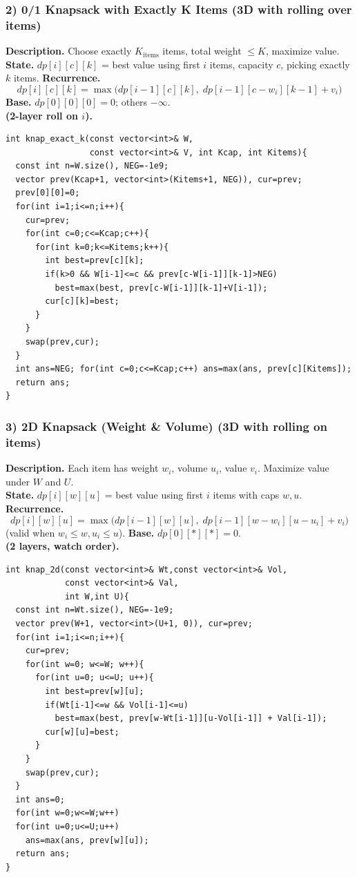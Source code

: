 \documentclass[9pt]{extarticle}
\begin{document}
\subsubsection{2) 0/1 Knapsack with Exactly K Items (3D with rolling over items)}
\textbf{Description.} Choose exactly \(K_{\text{items}}\) items, total weight \(\le K\), maximize value.  \\
\textbf{State.} \(dp[i][c][k]\) = best value using first \(i\) items, capacity \(c\), picking exactly \(k\) items.  
\textbf{Recurrence.}
\[
dp[i][c][k]=\max\Big(dp[i-1][c][k],\; dp[i-1][c-w_i][k-1]+v_i\Big)
\]
\textbf{Base.} \(dp[0][0][0]=0\); others \(-\infty\).  \\
\textbf{(2-layer roll on \(i\)).}
\begin{verbatim}
int knap_exact_k(const vector<int>& W, 
                 const vector<int>& V, int Kcap, int Kitems){
  const int n=W.size(), NEG=-1e9;
  vector prev(Kcap+1, vector<int>(Kitems+1, NEG)), cur=prev;
  prev[0][0]=0;
  for(int i=1;i<=n;i++){
    cur=prev;
    for(int c=0;c<=Kcap;c++){
      for(int k=0;k<=Kitems;k++){
        int best=prev[c][k];
        if(k>0 && W[i-1]<=c && prev[c-W[i-1]][k-1]>NEG)
          best=max(best, prev[c-W[i-1]][k-1]+V[i-1]);
        cur[c][k]=best;
      }
    }
    swap(prev,cur);
  }
  int ans=NEG; for(int c=0;c<=Kcap;c++) ans=max(ans, prev[c][Kitems]);
  return ans;
}
\end{verbatim}

\subsubsection{3) 2D Knapsack (Weight \& Volume) (3D with rolling on items)}
\textbf{Description.} Each item has weight \(w_i\), volume \(u_i\), value \(v_i\). Maximize value under \(W\) and \(U\).  \\
\textbf{State.} \(dp[i][w][u]\) = best value using first \(i\) items with caps \(w,u\).  \\
\textbf{Recurrence.}
\[
dp[i][w][u]=\max\Big(dp[i-1][w][u],\; dp[i-1][w-w_i][u-u_i]+v_i\Big)
\]
(valid when \(w_i\le w, u_i\le u\)).  
\textbf{Base.} \(dp[0][*][*]=0\).  \\
\textbf{(2 layers, watch order).}
\begin{verbatim}
int knap_2d(const vector<int>& Wt,const vector<int>& Vol,
            const vector<int>& Val,
            int W,int U){
  const int n=Wt.size(), NEG=-1e9;
  vector prev(W+1, vector<int>(U+1, 0)), cur=prev;
  for(int i=1;i<=n;i++){
    cur=prev;
    for(int w=0; w<=W; w++){
      for(int u=0; u<=U; u++){
        int best=prev[w][u];
        if(Wt[i-1]<=w && Vol[i-1]<=u)
          best=max(best, prev[w-Wt[i-1]][u-Vol[i-1]] + Val[i-1]);
        cur[w][u]=best;
      }
    }
    swap(prev,cur);
  }
  int ans=0; 
  for(int w=0;w<=W;w++) 
  for(int u=0;u<=U;u++) 
    ans=max(ans, prev[w][u]);
  return ans;
}
\end{verbatim}
\end{document}
